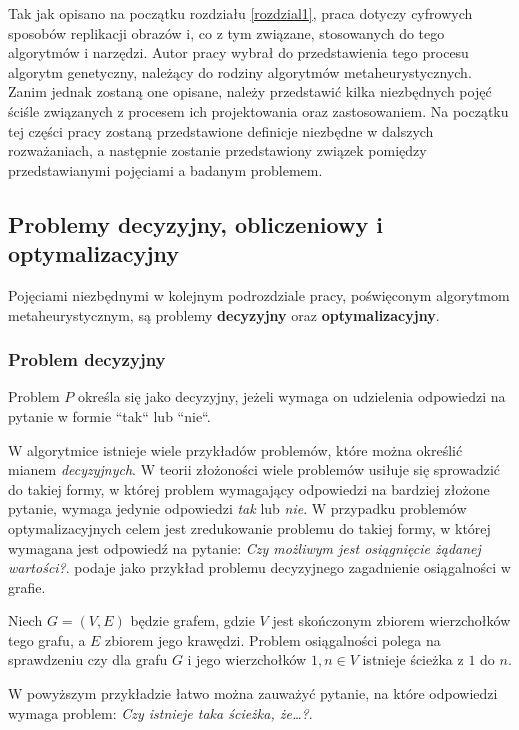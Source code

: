 Tak jak opisano na początku rozdziału \ref{rozdzial1}, praca dotyczy cyfrowych sposobów replikacji obrazów i, co z tym związane, stosowanych do tego algorytmów i narzędzi. Autor pracy wybrał do przedstawienia tego procesu algorytm genetyczny, należący do rodziny algorytmów metaheurystycznych. Zanim jednak zostaną one opisane, należy przedstawić kilka niezbędnych pojęć ściśle związanych z procesem ich projektowania oraz zastosowaniem. Na początku tej części pracy zostaną przedstawione definicje niezbędne w dalszych rozważaniach, a następnie zostanie przedstawiony związek pomiędzy przedstawianymi pojęciami a badanym problemem. 

\subsection{Problemy decyzyjny, obliczeniowy i optymalizacyjny}

Pojęciami niezbędnymi w kolejnym podrozdziale pracy, poświęconym algorytmom metaheurystycznym, są problemy \textbf{decyzyjny} oraz \textbf{optymalizacyjny}.

\subsubsection{Problem decyzyjny}

\begin{definition}
Problem $P$ określa się jako decyzyjny, jeżeli wymaga on udzielenia odpowiedzi na pytanie w formie ``tak`` lub ``nie``.
\end{definition}
W algorytmice istnieje wiele przykładów problemów, które można określić mianem \textit{decyzyjnych}. W teorii złożoności wiele problemów usiłuje się sprowadzić do takiej formy, w której problem wymagający odpowiedzi na bardziej złożone pytanie, wymaga jedynie odpowiedzi \textit{tak} lub \textit{nie}. W przypadku problemów optymalizacyjnych celem jest zredukowanie problemu do takiej formy, w której wymagana jest odpowiedź na pytanie: \textit{Czy możliwym jest osiągnięcie żądanej wartości?}. \cite{ZlozonoscObliczeniowa} podaje jako przykład problemu decyzyjnego zagadnienie osiągalności w grafie.

\begin{example}
Niech $G = (V, E)$ będzie grafem, gdzie $V$ jest skończonym zbiorem wierzchołków tego grafu, a $E$ zbiorem jego krawędzi. Problem osiągalności polega na sprawdzeniu czy dla grafu $G$ i jego wierzchołków $1, n \in V$ istnieje ścieżka z $1$ do $n$.
\end{example}
W powyższym przykładzie łatwo można zauważyć pytanie, na które odpowiedzi wymaga problem: \textit{Czy istnieje taka ścieżka, że\ldots?}.

